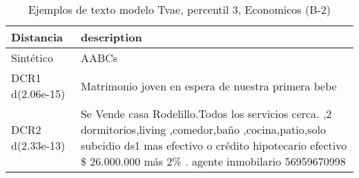 \begin{table}[H]
\centering
\fontsize{10}{14}\selectfont
\caption{Ejemplos de texto modelo Tvae, percentil 3, Economicos (B-2)}
\label{table-example-economicos-b-2-tvae-3p-text}
\begin{tabular}{|l|m{35em}|}
\hline
\rowcolor[gray]{0.8}
Distancia & description \\
\hline Sintético & AABCs \\
\hline DCR1 d(2.06e-15) & Matrimonio joven en espera de nuestra primera bebe \\
\hline DCR2 d(2.33e-13) & Se Vende casa  Rodelillo.Todos los servicios cerca. ,2 dormitorios,living ,comedor,ba\~no ,cocina,patio,solo subcidio ds1 mas efectivo o cr\'edito hipotecario efectivo \$ 26.000.000 m\'as 2\% . agente  inmobilario 56959670998 \\
\hline
\end{tabular}
\end{table}
